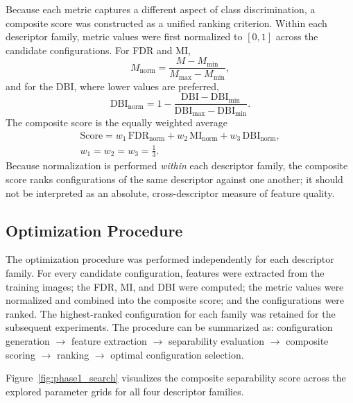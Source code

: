 Because each metric captures a different aspect of class discrimination, a
composite score was constructed as a unified ranking criterion. Within each
descriptor family, metric values were first normalized to $[0,1]$ across the
candidate configurations. For FDR and MI,
\begin{equation}
M_{\mathrm{norm}} = \frac{M - M_{\min}}{M_{\max} - M_{\min}},
\end{equation}
and for the DBI, where lower values are preferred,
\begin{equation}
\mathrm{DBI}_{\mathrm{norm}} = 1 - \frac{\mathrm{DBI} - \mathrm{DBI}_{\min}}
{\mathrm{DBI}_{\max} - \mathrm{DBI}_{\min}}.
\end{equation}
The composite score is the equally weighted average
\begin{equation}
\begin{split}
\mathrm{Score} = w_1\,\mathrm{FDR}_{\mathrm{norm}}
+ w_2\,\mathrm{MI}_{\mathrm{norm}}
+ w_3\,\mathrm{DBI}_{\mathrm{norm}}, \\
w_1 = w_2 = w_3 = \tfrac{1}{3}.
\end{split}
\end{equation}
Because normalization is performed \emph{within} each descriptor family, the
composite score ranks configurations of the same descriptor against one another;
it should not be interpreted as an absolute, cross-descriptor measure of feature
quality.

\subsection{Optimization Procedure}
\label{sec:phase1_procedure}

The optimization procedure was performed independently for each descriptor
family. For every candidate configuration, features were extracted from the
training images; the FDR, MI, and DBI were computed; the metric values were
normalized and combined into the composite score; and the configurations were
ranked. The highest-ranked configuration for each family was retained for the
subsequent experiments. The procedure can be summarized as: configuration
generation $\rightarrow$ feature extraction $\rightarrow$ separability
evaluation $\rightarrow$ composite scoring $\rightarrow$ ranking $\rightarrow$
optimal configuration selection.

Figure~\ref{fig:phase1_search} visualizes the composite separability score across
the explored parameter grids for all four descriptor families.

